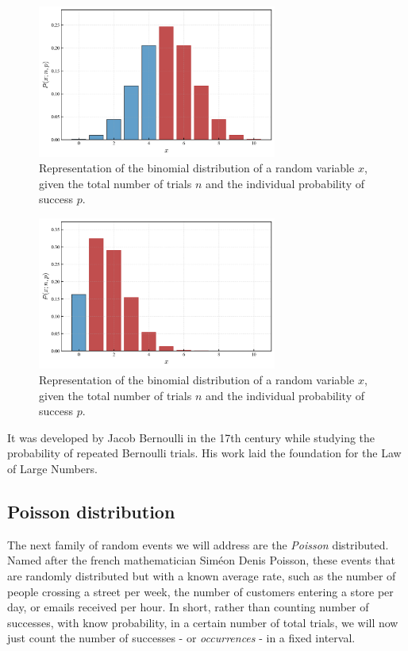 \documentclass{book}
\begin{document}
\begin{figure}[ht]
    \centering
    \includegraphics[width=0.7\textwidth]{figures/chapter2/binomial_1_cum.png}
    \caption{Representation of the binomial distribution of a random variable $x$, given the total number of trials $n$ and the individual probability of success $p$.}
    \label{fig:binomial1_cum}
\end{figure}

\begin{figure}[ht]
    \centering
    \includegraphics[width=0.7\textwidth]{figures/chapter2/binomial_2_cum.png}
    \caption{Representation of the binomial distribution of a random variable $x$, given the total number of trials $n$ and the individual probability of success $p$.}
    \label{fig:binomial2_cum}
\end{figure}

It was developed by Jacob Bernoulli in the 17th century while studying the probability of repeated Bernoulli trials. His work laid the foundation for the Law of Large Numbers.

\subsection{Poisson distribution}

The next family of random events we will address are the \textit{Poisson} distributed. Named after the french mathematician Sim\'eon Denis Poisson, these events that are randomly distributed but with a known average rate, such as the number of people crossing a street per week, the number of customers entering a store per day, or emails received per hour. In short, rather than counting number of successes, with know probability, in a certain number of total trials, we will now just count the number of successes - or \textit{occurrences} - in a fixed interval.
\end{document}
